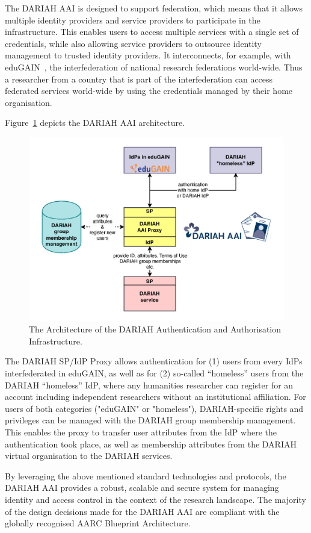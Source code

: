 \documentclass[final]{anthology-ch} %
\begin{document}
The DARIAH AAI is designed to support federation, which means that it allows multiple identity providers and service providers to participate in the infrastructure. This enables users to access multiple services with a single set of credentials, while also allowing service providers to outsource identity management to trusted identity providers. It interconnects, for example, with eduGAIN~\cite{web_eduGAIN}, the interfederation of national research federations world-wide. Thus a researcher from a country that is part of the interfederation can access federated services world-wide by using the credentials managed by their home organisation.

Figure~\ref{fig:dariahaai1} depicts the DARIAH AAI architecture.
%
\begin{figure}[t!]
  \centering
  \includegraphics[width=0.7\linewidth]{figures/Figure_dariahaai1-v2.png}
  \caption{The Architecture of the DARIAH Authentication and Authorisation Infrastructure.}
  \label{fig:dariahaai1}
\end{figure}
%
The DARIAH SP/IdP Proxy allows authentication for (1) users from every IdPs interfederated in eduGAIN, as well as for (2) so-called “homeless” users from the DARIAH “homeless” IdP, where any humanities researcher can register for an account including independent researchers without an institutional affiliation. 
For users of both categories ("eduGAIN" or "homeless"), DARIAH-specific rights and privileges can be managed with the DARIAH group membership management. This enables the proxy to transfer user attributes from the IdP where the authentication took place, as well as membership attributes from the DARIAH virtual organisation to the DARIAH services.

By leveraging the above mentioned standard technologies and protocols, the DARIAH AAI provides a robust, scalable and secure system for managing identity and access control in the context of the research landscape. The majority of the design decisions made for the DARIAH AAI are compliant with the globally recognised AARC Blueprint Architecture.
\end{document}
